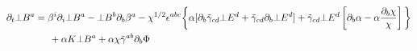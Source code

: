 \documentclass[prd]{revtex4}
\begin{document}
\begin{align}
\partial_t \bot B^a &= \beta^i \partial_i \bot B^a - \bot B^b \partial_b \beta^a - \chi^{1/2} \epsilon^{abc} \bigg \{ \alpha [\partial_b \tilde{\gamma}_{cd} \bot E^d + \tilde{\gamma}_{cd} \partial_b \bot E^d] + \tilde{\gamma}_{cd} \bot E^d \left[ \partial_b \alpha - \alpha \frac{\partial_b \chi}{\chi} \right] \bigg \} \nonumber \\
			    & \indent + \alpha K \bot B^a + \alpha \chi \tilde{\gamma}^{ab} \partial_b \Phi
\end{align}
\end{document}
